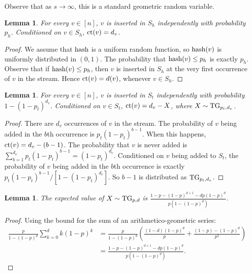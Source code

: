 \documentclass[11pt]{article}
\newtheorem{lemma}[theorem]{Lemma}
\theoremstyle{definition}
\newcommand{\hash}{\hbox{hash}}
\newcommand{\ct}{\hbox{ct}}
\newcommand{\tg}{\hbox{TG}}
\begin{document}
Observe that as $s \rightarrow \infty$, this is a standard geometric random variable.

\begin{lemma} \label{lem:samp-head} For every $v \in [n]$, $v$ is inserted in $S_h$ independently with probability $p_h$. Conditioned on $v \in S_h$, $\ct(v) = d_v$.
\end{lemma}

\begin{proof} We assume that $\hash$ is a uniform random function, so $\hash(v)$ is uniformly distributed in $(0,1)$.
The probability that $\hash(v) \leq p_h$ is exactly $p_h$. Observe that if $\hash(v) \leq p_h$, then $v$
is inserted in $S_h$ at the very first occurrence of $v$ in the stream. Hence $\ct(v) = d(v)$, whenever $v \in S_h$.
\end{proof}

\begin{lemma} \label{lem:samp-tail} For every $v \in [n]$, $v$ is inserted in $S_t$ independently with probability $1-(1-p_t)^{d_v}$. Conditioned on $v \in S_t$, $\ct(v) = d_v - X$, where $X \sim \tg_{p_t,d_v}$.
\end{lemma}

\begin{proof} There are $d_v$ occurrences of $v$ in the stream. The probability
of $v$ being added in the $b$th occurrence is $p_t(1-p_t)^{b-1}$. When this happens,
$\ct(v) = d_v - (b-1)$. The probability that $v$ is never added is $\sum_{b=1}^{d_v} p_t(1-p_t)^{b-1} = (1-p_t)^{d_v}$.
Conditioned on $v$ being added to $S_t$, the probability of $v$ being added
in the $b$th occurrence is exactly $p_t(1-p_t)^{b-1}/[1-(1-p_t)^{d_v}]$.
So $b-1$ is distributed as $\tg_{p_t,d_v}$.
\end{proof}

\begin{lemma} \label{lem:geo} The expected value of $X \sim \tg_{p,d}$ is $\frac{1 - p - (1-p)^{d+1} - dp(1-p)^d}{p(1-(1-p)^d)}$.
\end{lemma}

\begin{proof} Using the bound for the sum of an arithmetico-geometric series:
\begin{align*}
\frac{p}{1-(1-p)^d} \sum_{k=0}^d k(1-p)^k
&= \frac{p}{1-(1-p)^d} \left( \frac{(1-d)(1-p)^d}{p} + \frac{(1-p)-(1-p)^d}{p^2} \right)\\
&= \frac{1 - p - (1-p)^{d+1} - dp(1-p)^d}{p(1-(1-p)^d)}.
\end{align*}
\end{proof}
\end{document}
